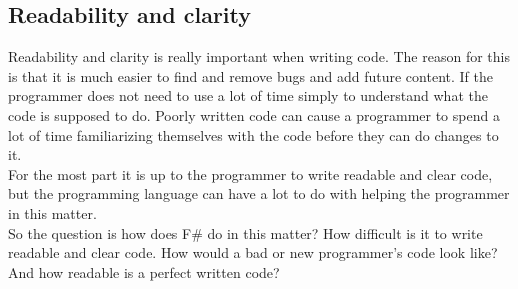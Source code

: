 \documentclass[12pt, a4paper]{article}
\begin{document}





\newpage
\subsection{Readability and clarity}
Readability and clarity is really important when writing code. The reason for this is that it is much easier to find and remove bugs and add future content. If the programmer does not need to use a lot of time simply to understand what the code is supposed to do. Poorly written code can cause a programmer to spend a lot of time familiarizing themselves with the code before they can do changes to it.\\

For the most part it is up to the programmer to write readable and clear code, but the programming language can have a lot to do with helping the programmer in this matter.\\


So the question is how does F\# do in this matter? How difficult is it to write readable and clear code. How would a bad or new programmer's code look like? And how readable is a perfect written code?
\end{document}
